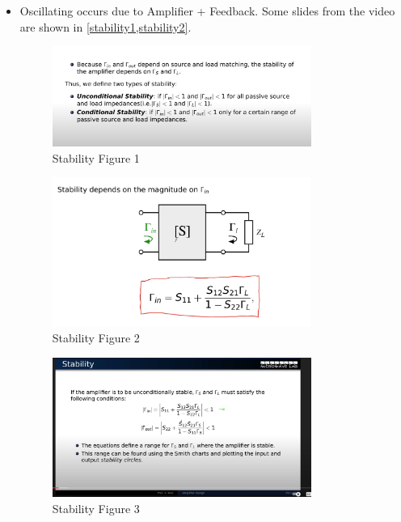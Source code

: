 \documentclass{article}
\begin{document}
\begin{itemize}
    \item Oscillating occurs due to Amplifier + Feedback. Some slides from the video are shown in \cref{stability1,stability2}.
    
    \begin{figure}[H]
        \centering
        \includegraphics[width=0.8\textwidth]{figures/stability 1.png}
        \caption{Stability Figure 1}
        \label{stability1}
    \end{figure}

    \begin{figure}[H]
        \centering
        \includegraphics[width=0.8\textwidth]{figures/stability 2.png}
        \caption{Stability Figure 2}
        \label{stability2}
    \end{figure}

    
    \begin{figure}[H]
        \centering
        \includegraphics[width=0.8\textwidth]{figures/stability 3.png}
        \caption{Stability Figure 3}
        \label{stability3}
    \end{figure}


\end{itemize}
\end{document}
